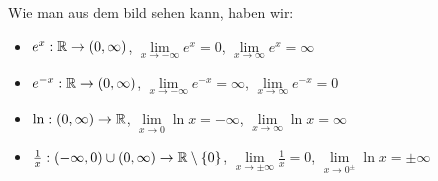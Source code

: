 \begin{minipage}{\linewidth}
\begin{center}
\begin{tikzpicture}[x=1.15cm, y=0.5cm]
\end{tikzpicture}
\end{center}
Wie man aus dem bild sehen kann, haben wir:
\begin{itemize}
    \item $e^x: \mathbb{R} \to (0, \infty)$, $\lim\limits_{x\to -\infty} e^x = 0$, $\lim\limits_{x\to \infty} e^x = \infty$
    \item $e^{-x}: \mathbb{R} \to (0, \infty)$, $\lim\limits_{x\to -\infty} e^{-x} = \infty$, $\lim\limits_{x\to \infty} e^{-x} = 0$
    \item $\ln: (0, \infty) \to \mathbb{R}$, $\lim\limits_{x\to 0} \ln x = -\infty$, $\lim\limits_{x\to \infty} \ln x = \infty$
    \item $\frac{1}{x}: (-\infty, 0) \cup (0, \infty) \to \mathbb{R}\setminus\{0\}$, $\lim\limits_{x\to \pm \infty} \frac{1}{x} = 0$, $\lim\limits_{x\to 0^\pm} \ln x = \pm\infty$
\end{itemize}
\end{minipage}

